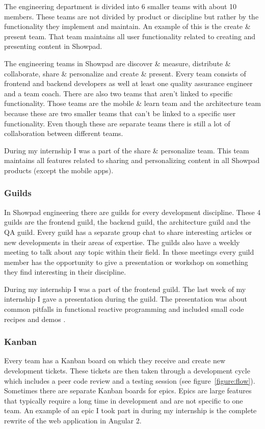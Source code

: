 The engineering department is divided into 6 smaller teams with about 10 members. These teams are not divided by product or discipline but rather by the functionality they implement and maintain. An example of this is the create \& present team. That team maintains all user functionality related to creating and presenting content in Showpad.

The engineering teams in Showpad are discover \& measure, distribute \& collaborate, share \& personalize and create \& present. Every team consists of frontend and backend developers as well at least one quality assurance engineer and a team coach. There are also two teams that aren't linked to specific functionality. Those teams are the mobile \& learn team and the architecture team because these are two smaller teams that can't be linked to a specific user functionality. Even though these are separate teams there is still a lot of collaboration between different teams.

During my internship I was a part of the share \& personalize team. This team maintains all features related to sharing and personalizing content in all Showpad products (except the mobile apps).


\subsubsection{Guilds}

In Showpad engineering there are guilds for every development discipline. These 4 guilds are the frontend guild, the backend guild, the architecture guild and the QA guild. Every guild has a separate group chat to share interesting articles or new developments in their areas of expertise. The guilds also have a weekly meeting to talk about any topic within their field. In these meetings every guild member has the opportunity to give a presentation or workshop on something they find interesting in their discipline.

During my internship I was a part of the frontend guild. The last week of my internship I gave a presentation during the guild. The presentation was about common pitfalls in functional reactive programming and included small code recipes and demos \cite{slides}.

\subsubsection{Kanban}

Every team has a Kanban board \cite{kanban} on which they receive and create new development tickets. These tickets are then taken through a development cycle which includes a peer code review and a testing session (see figure~\ref{figure:flow}). Sometimes there are separate Kanban boards for epics. Epics are large features that typically require a long time in development and are not specific to one team. An example of an epic I took part in during my internship is the complete rewrite of the web application in Angular 2.

